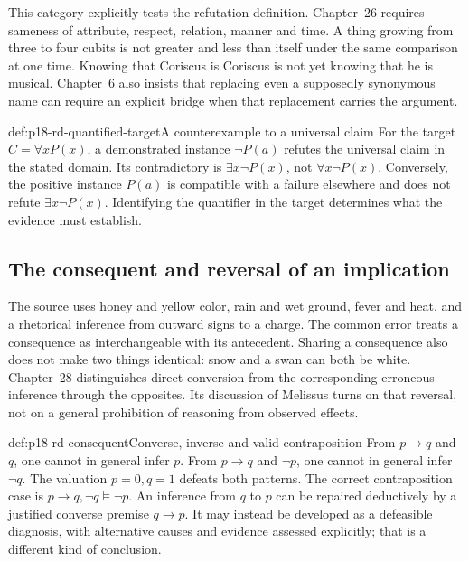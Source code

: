 This category explicitly tests the refutation definition. Chapter~26
requires sameness of attribute, respect, relation, manner and time.
A thing growing from three to four cubits is not greater and less
than itself under the same comparison at one time. Knowing that
Coriscus is Coriscus is not yet knowing that he is musical. Chapter~6
also insists that replacing even a supposedly synonymous name can
require an explicit bridge when that replacement carries the argument.

\begin{hbexample}{def:p18-rd-quantified-target}{A counterexample to a universal claim}
For the target \(C=\forall x P(x)\), a demonstrated instance
\(\neg P(a)\) refutes the universal claim in the stated domain.
Its contradictory is \(\exists x\neg P(x)\), not
\(\forall x\neg P(x)\). Conversely, the positive instance
\(P(a)\) is compatible with a failure elsewhere and does not
refute \(\exists x\neg P(x)\). Identifying the quantifier in
the target determines what the evidence must establish.
\end{hbexample}

\subsection{The consequent and reversal of an implication}

The source uses honey and yellow color, rain and wet ground, fever
and heat, and a rhetorical inference from outward signs to a charge.
The common error treats a consequence as interchangeable with its
antecedent. Sharing a consequence also does not make two things identical:
snow and a swan can both be white. Chapter~28 distinguishes direct
conversion from the corresponding erroneous inference through the
opposites. Its discussion of Melissus turns on that reversal, not on
a general prohibition of reasoning from observed effects.

\begin{hbexample}{def:p18-rd-consequent}{Converse, inverse and valid contraposition}
From \(p\to q\) and \(q\), one cannot in general infer \(p\).
From \(p\to q\) and \(\neg p\), one cannot in general infer
\(\neg q\). The valuation \(p=0,q=1\) defeats both patterns.
The correct contraposition case is
\(p\to q,\neg q\models\neg p\).
An inference from \(q\) to \(p\) can be repaired deductively
by a justified converse premise \(q\to p\). It may instead be
developed as a defeasible diagnosis, with alternative causes and evidence
assessed explicitly; that is a different kind of conclusion.
\end{hbexample}

